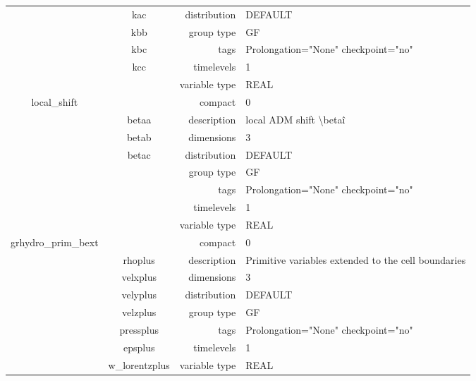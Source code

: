 \documentclass{article}
\begin{document}
\begin{tabular*}{150mm}{|c|c@{\extracolsep{\fill}}|rl|}
 & kac & distribution & DEFAULT \\ 
 & kbb & group type & GF \\ 
 & kbc & tags & Prolongation="None" checkpoint="no" \\ 
 & kcc & timelevels & 1 \\ 
 &  & variable type & REAL \\ 
\hline 
local\_shift &  & compact & 0 \\ 
 & betaa & description & local ADM shift {\textbackslash}beta\^i \\ 
 & betab & dimensions & 3 \\ 
 & betac & distribution & DEFAULT \\ 
 &  & group type & GF \\ 
 &  & tags & Prolongation="None" checkpoint="no" \\ 
 &  & timelevels & 1 \\ 
 &  & variable type & REAL \\ 
\hline 
grhydro\_prim\_bext &  & compact & 0 \\ 
 & rhoplus & description & Primitive variables extended to the cell boundaries \\ 
 & velxplus & dimensions & 3 \\ 
 & velyplus & distribution & DEFAULT \\ 
 & velzplus & group type & GF \\ 
 & pressplus & tags & Prolongation="None" checkpoint="no" \\ 
 & epsplus & timelevels & 1 \\ 
 & w\_lorentzplus & variable type & REAL \\ 
\hline 
\end{tabular*} 



\vspace{5mm}
\vspace{5mm}
\end{document}
